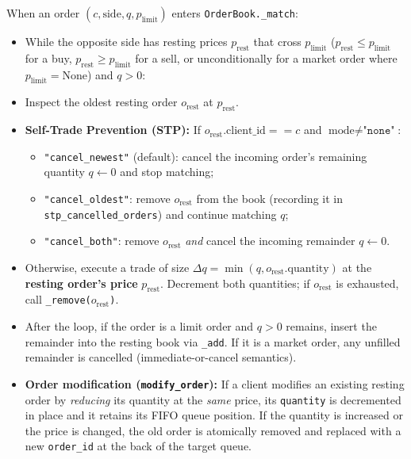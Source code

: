 \documentclass[11pt,a4paper]{article}
\newcommand{\code}[1]{\texttt{#1}}
\begin{document}
When an order $(c, \text{side}, q, p_{\text{limit}})$ enters \code{OrderBook.\_match}:
\begin{itemize}[nosep]
\item While the opposite side has resting prices $p_{\text{rest}}$ that cross $p_{\text{limit}}$
  ($p_{\text{rest}} \le p_{\text{limit}}$ for a buy, $p_{\text{rest}} \ge p_{\text{limit}}$ for a sell,
  or unconditionally for a market order where $p_{\text{limit}} = \text{None}$) and $q > 0$:
\item Inspect the oldest resting order $o_{\text{rest}}$ at $p_{\text{rest}}$.
\item \textbf{Self-Trade Prevention (STP):} If $o_{\text{rest}}.\text{client\_id} == c$ and
  $\text{mode} \neq \code{"none"}$:
  \begin{itemize}[nosep]
  \item \code{"cancel\_newest"} (default): cancel the incoming order's remaining quantity $q \leftarrow 0$
    and stop matching;
  \item \code{"cancel\_oldest"}: remove $o_{\text{rest}}$ from the book (recording it in
    \code{stp\_cancelled\_orders}) and continue matching $q$;
  \item \code{"cancel\_both"}: remove $o_{\text{rest}}$ \emph{and} cancel the incoming remainder $q \leftarrow 0$.
  \end{itemize}
\item Otherwise, execute a trade of size $\Delta q = \min(q, o_{\text{rest}}.\text{quantity})$ at the
  \textbf{resting order's price} $p_{\text{rest}}$. Decrement both quantities; if $o_{\text{rest}}$ is
  exhausted, call \code{\_remove($o_{\text{rest}}$)}.
\item After the loop, if the order is a limit order and $q > 0$ remains, insert the remainder into the
  resting book via \code{\_add}. If it is a market order, any unfilled remainder is cancelled
  (immediate-or-cancel semantics).
\item \textbf{Order modification (\code{modify\_order}):} If a client modifies an existing resting order
  by \emph{reducing} its quantity at the \emph{same} price, its \code{quantity} is decremented in place
  and it retains its FIFO queue position. If the quantity is increased or the price is changed, the old
  order is atomically removed and replaced with a new \code{order\_id} at the back of the target queue.
\end{itemize}

\end{document}
